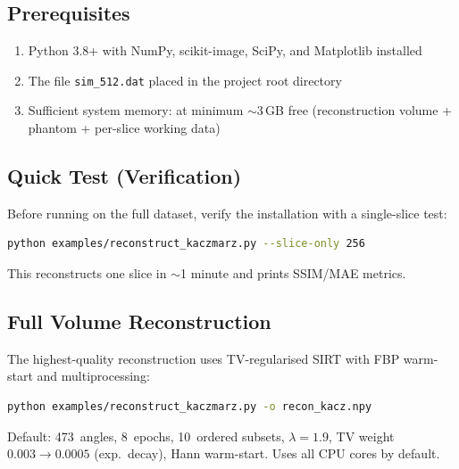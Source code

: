 \documentclass[11pt,a4paper]{article}
\begin{document}
\subsection{Prerequisites}

\begin{enumerate}
    \item Python 3.8+ with NumPy, scikit-image, SciPy, and Matplotlib installed
    \item The file \texttt{sim\_512.dat} placed in the project root directory
    \item Sufficient system memory: at minimum $\sim$3\,GB free (reconstruction volume + phantom + per-slice working data)
\end{enumerate}

\subsection{Quick Test (Verification)}

Before running on the full dataset, verify the installation with a single-slice test:
\begin{lstlisting}[language=bash]
python examples/reconstruct_kaczmarz.py --slice-only 256
\end{lstlisting}
This reconstructs one slice in $\sim$1 minute and prints SSIM/MAE metrics.

\subsection{Full Volume Reconstruction}

The highest-quality reconstruction uses TV-regularised SIRT with FBP warm-start and multiprocessing:
\begin{lstlisting}[language=bash]
python examples/reconstruct_kaczmarz.py -o recon_kacz.npy
\end{lstlisting}
Default: 473~angles, 8~epochs, 10~ordered subsets, $\lambda = 1.9$, TV weight $0.003 \to 0.0005$ (exp.~decay), Hann warm-start.  Uses all CPU cores by default.
\end{document}
